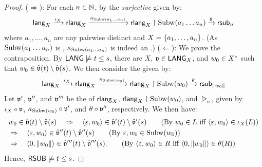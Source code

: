 \begin{proof}
    ($\Rightarrow$):
    For each $n \in \mathbb{N}$, by the \emph{surjective}  given by:
    \[\mathsf{lang}_{X} \xrightarrow{\iota_{X}} \mathsf{rlang}_{X} \xrightarrow{\kappa_{\mathrm{Subw}(a_1 \dots a_n)}}
    \mathsf{rlang}_{X} \restriction \mathrm{Subw}(a_1 \dots a_n) \xrightarrow{\theta} \mathsf{rsub}_{n}\]
    where $a_1, \dots, a_n$ are any pairwise distinct  and $X = \{a_1, \dots, a_n\}$.
    (As $\mathrm{Subw}(a_1 \dots a_n)$ is , $\kappa_{\mathrm{Subw}(a_1 \dots a_n)}$ is indeed an .)
    ($\Leftarrow$):
    We prove the contraposition.
    By $\LANG \not\models \term[1] \le \term[2]$, there are $X$, $\mathfrak{v} \in \mathsf{LANG}_X$, and $\word_0 \in X^*$ such that $\word_0 \in \hat{\val}(\term[1]) \setminus \hat{\val}(\term[2])$.
    We then consider the  given by:
    \[\lang_{X} \xrightarrow{\iota_{X}} \rlang_{X} \xrightarrow{\kappa_{\Subw(\word_0)}} \rlang_{X} \restriction \Subw(\word_0) \xrightarrow{\theta} \rsub_{\len{\word_0}}\]
    Let $\mathfrak{v}'$, $\mathfrak{v}''$, and $\mathfrak{v}'''$ be the  of $\mathsf{rlang}_{X}$, $\rlang_{X} \restriction \Subw(\word_0)$, and $\rsub_n$, given by
    $\iota_X \circ \mathfrak{v}$, $\kappa_{\Subw(\word_0)} \circ \val'$, and $\theta \circ \mathfrak{v}''$, respectively.
    We then have:
    \begin{align*}
        &\word_0 \in \hat{\val}(\term[1]) \setminus \hat{\val}(\term[2]) \quad\Rightarrow\quad \tuple{\eps, \word_0} \in \hat{\val}'(\term[1]) \setminus \hat{\val}'(\term[2]) \tag{By $\word_0 \in L$ iff $\tuple{\eps, \word_0} \in \iota_{X}(L)$}\\
        &\Rightarrow\quad \tuple{\eps, \word_0} \in \hat{\val}''(\term[1])  \setminus \hat{\val}''(\term[2])\tag{By $\eps, \word_0 \in \Subw(\word_0)$}\\
        &\Rightarrow\quad \tuple{0, \len{\word_0}} \in \hat{\val}'''(\term[1]) \setminus \hat{\val}'''(\term[2]). \tag{By $\tuple{\eps, \word_0} \in R$ iff $\tuple{0, \len{\word_0}} \in \theta(R)$}
    \end{align*}
    Hence, $\RSUB \not\models \term[1] \le \term[2]$.
\end{proof}

